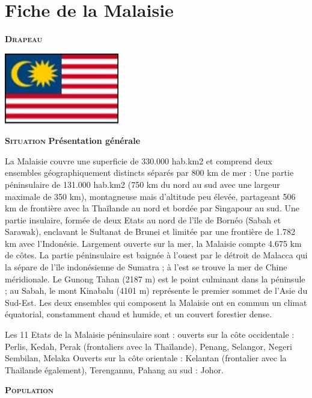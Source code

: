 \section{Fiche de la Malaisie}

\begin{multicols}{2}

\textbf{\textsc{Drapeau}}

\smallbreak
\hspace*{-0.65cm}
\includegraphics[width=5cm]{articles/Fiche-de-la-malaisie/1210328778gbyq.jpg}
\smallbreak


\textbf{\textsc{Situation}}
\textbf{Présentation générale}

La Malaisie couvre une superficie de 330.000 hab.km2 et comprend deux ensembles géographiquement distincts séparés par 800 km de mer :  Une partie péninsulaire de 131.000 hab.km2 (750 km du nord au sud avec une largeur maximale de 350 km), montagneuse mais d'altitude peu élevée, partageant 506 km de frontière avec la Thaïlande au nord et bordée par Singapour au sud.
Une partie insulaire, formée de deux Etats au nord de l'île de Bornéo (Sabah et Sarawak), enclavant le Sultanat de Brunei et limitée par une frontière de 1.782 km avec l'Indonésie. Largement ouverte sur la mer, la Malaisie compte 4.675 km de côtes. La partie péninsulaire est baignée à l'ouest par le détroit de Malacca qui la sépare de l'île indonésienne de Sumatra ; à l'est se trouve la mer de Chine méridionale. Le Gunong Tahan (2187 m) est le point culminant dans la péninsule ; au Sabah, le mont Kinabalu (4101 m) représente le premier sommet de l'Asie du Sud-Est. Les deux ensembles qui composent la Malaisie ont en commun un climat équatorial, constamment chaud et humide, et un couvert forestier dense.

Les 11 Etats de la Malaisie péninsulaire sont :  ouverts sur la côte occidentale : Perlis, Kedah, Perak (frontaliers avec la Thaïlande), Penang, Selangor, Negeri Sembilan, Melaka Ouverts sur la côte orientale : Kelantan (frontalier avec la Thaïlande également), Terengannu, Pahang au sud : Johor.

\textbf{\textsc{Population}}


\end{multicols}

